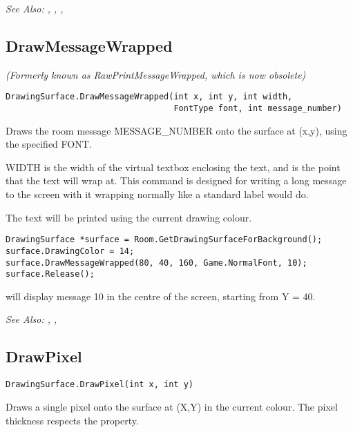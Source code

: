 \it{See Also:} ,
,
,


\subsection{DrawMessageWrapped}\label{DrawingSurface.DrawMessageWrapped}%

\it{(Formerly known as RawPrintMessageWrapped, which is now obsolete)}

\begin{verbatim}
DrawingSurface.DrawMessageWrapped(int x, int y, int width,
                                  FontType font, int message_number)
\end{verbatim}
Draws the room message MESSAGE_NUMBER onto the surface at (x,y), using the
specified FONT.

WIDTH is the width of the virtual textbox enclosing the text, and is the point that
the text will wrap at. This command is designed for writing a long message to the
screen with it wrapping normally like a standard label would do.

The text will be printed using the current drawing colour.

\begin{verbatim}
DrawingSurface *surface = Room.GetDrawingSurfaceForBackground();
surface.DrawingColor = 14;
surface.DrawMessageWrapped(80, 40, 160, Game.NormalFont, 10);
surface.Release();
\end{verbatim}
will display message 10 in the centre of the screen, starting from Y = 40.

\it{See Also:} ,
,


\subsection{DrawPixel}\label{DrawingSurface.DrawPixel}%

\begin{verbatim}
DrawingSurface.DrawPixel(int x, int y)
\end{verbatim}
Draws a single pixel onto the surface at (X,Y) in the current colour. The pixel
thickness respects the 
property.

